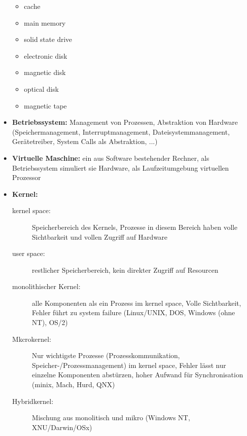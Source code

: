 \begin{itemize}
\begin{itemize}
     \item  cache 
     \item  main memory 
     \item  solid state drive 
     \item  electronic disk 
     \item  magnetic disk 
     \item  optical disk 
     \item  magnetic tape 
    \end{itemize}
   \item \textbf{Betriebssystem:} Management von Prozessen, Abstraktion von Hardware (Speichermanagement, Interruptmanagement, Dateisystemmanagement, Gerätetreiber, System Calls als Abstraktion, ...)
   \item \textbf{Virtuelle Maschine:} ein aus Software bestehender Rechner, als Betriebssystem simuliert sie Hardware, als Laufzeitumgebung virtuellen Prozessor
   \item \textbf{Kernel:}
    \begin{description}
     \item[kernel space:] Speicherbereich des Kernels, Prozesse in diesem Bereich haben volle Sichtbarkeit und vollen Zugriff auf Hardware     
     \item[user space:] restlicher Speicherbereich, kein direkter Zugriff auf Resourcen
     \item[monolithischer Kernel:] alle Komponenten als ein Prozess im kernel space, Volle Sichtbarkeit, Fehler führt zu system failure (Linux/UNIX, DOS, Windows (ohne NT), OS/2)
     \item[Mkcrokernel:] Nur wichtigste Prozesse (Prozesskommunikation, Speicher-/Prozessmanagement) im kernel space, Fehler lässt nur einzelne Komponenten abstürzen, hoher Aufwand für Synchronisation (minix, Mach, Hurd, QNX)
     \item[Hybridkernel:] Mischung aus monolitisch und mikro (Windows NT, XNU/Darwin/OSx)
    \end{description}
 \end{itemize}
 
